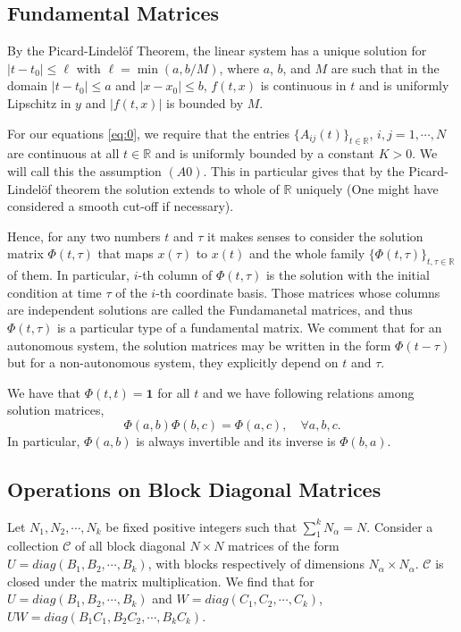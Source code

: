 \documentclass[a4paper,11pt]{article}
\newcommand{\C}{\mathcal{C}}
\newcounter{Theorem}
\theoremstyle{remark}
\begin{document}
\subsection{Fundamental Matrices}

By the Picard-Lindel\"{o}f Theorem, the linear system has a unique solution for $|t-t_0| \le \ell$ with $\ell=\min(a,b/M)$, where $a$, $b$, and $M$ are such that in the domain $|t-t_0|\le a$ and $|x-x_0| \le b$, $f(t,x)$ is continuous in $t$ and is uniformly Lipschitz in $y$ and $|f(t,x)|$ is bounded by $M$. 

For our equations \eqref{eq:0}, we require that the entries $\{A_{ij}(t)\}_{t\in \mathbb{R}}$, $i,j=1,\cdots,N$ are continuous at all $t\in \mathbb{R}$ and is uniformly bounded by a constant $K>0$. We will call this the assumption $(A0)$. This in particular gives that by the Picard-Lindel\"{o}f theorem the solution extends to whole of $ \mathbb{R}$ uniquely (One might have considered a smooth cut-off if necessary). 

Hence, for any two numbers $t$ and $\tau$ it makes senses to consider the solution matrix $\Phi(t,\tau)$  that maps $x(\tau)$ to $x(t)$ and the whole family $\{\Phi(t,\tau)\}_{t,\tau \in \mathbb{R}}$ of them. In particular, $i$-th column of $\Phi(t,\tau)$ is the solution with the initial condition at time $\tau$ of the $i$-th coordinate basis. Those matrices whose columns are independent solutions are called the Fundamanetal matrices, and thus $\Phi(t,\tau)$ is a particular type of a fundamental matrix.   We comment that for an autonomous system, the solution matrices may be written in the form $\Phi(t-\tau)$ but for a non-autonomous system, they explicitly depend on $t$ and $\tau$.

We have that $\Phi(t,t)=\mathbf{1}$ for all $t$ and we have following relations among solution matrices,
$$\Phi(a,b)\Phi(b,c) = \Phi(a,c), \quad \forall a,b,c.$$
In particular, $\Phi(a,b)$ is always invertible and its inverse is $\Phi(b,a)$. %

\subsection{Operations on Block Diagonal Matrices}

Let $N_1,N_2, \cdots, N_k$ be fixed positive integers such that $\sum_1^k N_\alpha = N$. Consider a collection $\C$ of all block diagonal $N\times N$ matrices of the form $U = diag(B_1,B_2, \cdots,B_k)$, with blocks respectively of dimensions $N_\alpha\times N_\alpha$. $\C$ is closed under the matrix multiplication. We find that for $U = diag(B_1,B_2, \cdots,B_k)$ and $W = diag(C_1,C_2, \cdots,C_k)$, $UW = diag(B_1C_1, B_2C_2,\cdots,B_kC_k)$. %
\end{document}
